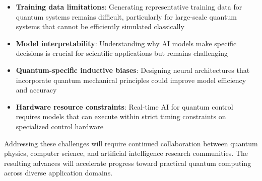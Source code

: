 \begin{itemize}
    \item \textbf{Training data limitations}: Generating representative training data for quantum systems remains difficult, particularly for large-scale quantum systems that cannot be efficiently simulated classically
    
    \item \textbf{Model interpretability}: Understanding why AI models make specific decisions is crucial for scientific applications but remains challenging
    
    \item \textbf{Quantum-specific inductive biases}: Designing neural architectures that incorporate quantum mechanical principles could improve model efficiency and accuracy
    
    \item \textbf{Hardware resource constraints}: Real-time AI for quantum control requires models that can execute within strict timing constraints on specialized control hardware
\end{itemize}

Addressing these challenges will require continued collaboration between quantum physics, computer science, and artificial intelligence research communities. The resulting advances will accelerate progress toward practical quantum computing across diverse application domains. 